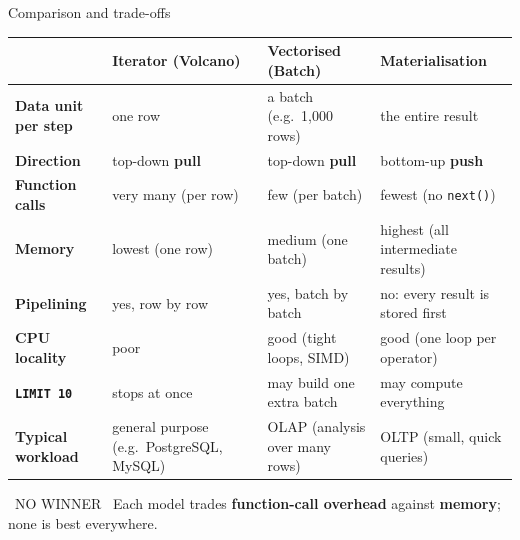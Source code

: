 \begin{frame}{Comparison and trade-offs}
  \centering
  \scriptsize
  \renewcommand{\arraystretch}{1.12}
  \begin{tabular}{@{}>{\bfseries}p{}p{}p{}p{}@{}}
    \toprule
    & \textcolor{vinuNavy}{Iterator (Volcano)} & \textcolor{vinuNavy}{Vectorised (Batch)} & \textcolor{vinuRed}{Materialisation}\\
    \midrule
    Data unit per step   & one row & a batch (e.g.\ 1,000 rows) & the entire result\\
    Direction            & top-down \textbf{pull} & top-down \textbf{pull} & bottom-up \textbf{push}\\
    Function calls       & very many (per row) & few (per batch) & fewest (no \texttt{next()})\\
    Memory               & lowest (one row) & medium (one batch) & highest (all intermediate results)\\
    Pipelining           & yes, row by row & yes, batch by batch & no: every result is stored first\\
    CPU locality         & poor & good (tight loops, SIMD) & good (one loop per operator)\\
    \texttt{LIMIT 10}    & stops at once & may build one extra batch & may compute everything\\
    Typical workload     & general purpose (e.g.\ PostgreSQL, MySQL) & OLAP (analysis over many rows) & OLTP (small, quick queries)\\
    \bottomrule
  \end{tabular}
  \vspace{1.5mm}
  {\footnotesize\colorbox{vinuRed}{\color{white}\vinuHeadFontSB\scriptsize\ NO WINNER\ }\;
   Each model trades \textbf{function-call overhead} against \textbf{memory}; none is best everywhere.}
\end{frame}

